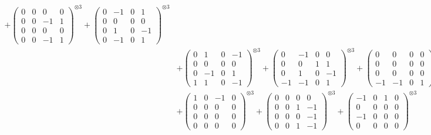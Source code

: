 \documentclass{article}
\begin{document}
{\begin{align}
            + \begin{pmatrix} 0 & 0 & 0 & 0 \\ 0 & 0 & -1 & 1 \\ 0 & 0 & 0 & 0 \\ 0 & 0 & -1 & 1 \end{pmatrix}^{\otimes 3} 
            + \begin{pmatrix} 0 & -1 & 0 & 1 \\ 0 & 0 & 0 & 0 \\ 0 & 1 & 0 & -1 \\ 0 & -1 & 0 & 1 \end{pmatrix}^{\otimes 3} \\
        &+ \label{Rs16-Rc11-Solution-15-c10} \begin{pmatrix} 0 & 1 & 0 & -1 \\ 0 & 0 & 0 & 0 \\ 0 & -1 & 0 & 1 \\ 1 & 1 & 0 & -1 \end{pmatrix}^{\otimes 3} 
            + \begin{pmatrix} 0 & -1 & 0 & 0 \\ 0 & 0 & 1 & 1 \\ 0 & 1 & 0 & -1 \\ -1 & -1 & 0 & 1 \end{pmatrix}^{\otimes 3} 
            + \begin{pmatrix} 0 & 0 & 0 & 0 \\ 0 & 0 & 0 & 0 \\ 0 & 0 & 0 & 0 \\ -1 & -1 & 0 & 1 \end{pmatrix}^{\otimes 3} \\
        &+ \label{Rs16-Rc11-Solution-15-c13} \begin{pmatrix} 1 & 0 & -1 & 0 \\ 0 & 0 & 0 & 0 \\ 0 & 0 & 0 & 0 \\ 0 & 0 & 0 & 0 \end{pmatrix}^{\otimes 3} 
            + \begin{pmatrix} 0 & 0 & 0 & 0 \\ 0 & 0 & 1 & -1 \\ 0 & 0 & 0 & -1 \\ 0 & 0 & 1 & -1 \end{pmatrix}^{\otimes 3} 
            + \begin{pmatrix} -1 & 0 & 1 & 0 \\ 0 & 0 & 0 & 0 \\ -1 & 0 & 0 & 0 \\ 0 & 0 & 0 & 0 \end{pmatrix}^{\otimes 3} \\

\end{align}}
\end{document}
